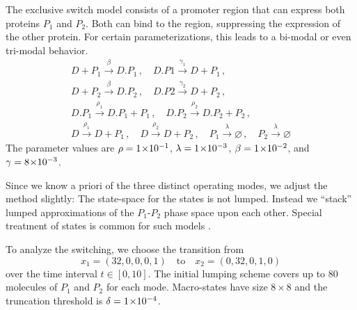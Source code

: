 \begin{model}\label{model:excl_switch_2} The exclusive switch model consists of a promoter region
that can express both proteins $P_1$ and $P_2$. Both can bind to the region, suppressing
the expression of the other protein. For certain parameterizations, this leads to a
bi-modal or even tri-modal behavior.
\begin{gather*}
	D + P_1 \xrightarrow{\beta} D.P_1\,,\quad
	D.P1 \xrightarrow{\gamma_1} D + P_1  \,,\\
	D + P_2 \xrightarrow{\beta} D.P_2 \,,\quad
	D.P2 \xrightarrow{\gamma_2} D + P_2 \,,\\
	D.P_1 \xrightarrow{\rho_1} D.P_1 + P_1\,, \quad
    D.P_2 \xrightarrow{\rho_2} D.P_2 + P_2\,,\\
	D \xrightarrow{\rho_1} D + P_1\,,\quad
	D \xrightarrow{\rho_2} D + P_2\,,  \quad
	P_1 \xrightarrow{\lambda}\varnothing  \,,\quad
    P_2\xrightarrow{\lambda} \varnothing
\end{gather*}
The parameter values are $\rho= 1\!\times\hspace{-.5ex} 10^{-1} $, $\lambda= 1\!\times\hspace{-.5ex} 10^{-3} $, $\beta= 1\!\times\hspace{-.5ex} 10^{-2} $, and $\gamma= 8\!\times\hspace{-.5ex} 10^{-3} $.
\end{model}
Since we know a priori of the three distinct operating modes, we adjust
the method slightly:
The state-space for the  states is not lumped. Instead we ``stack''
lumped approximations of the $P_1$-$P_2$ phase space upon each other. Special treatment of  states is common for such models \parencite{lapin2011shave}. 

To analyze the switching, we choose the transition from
\[
	x_{1} = (32, 0, 0, 0, 1) 
    \quad
    \text{to}
    \quad
 x_2 = (0, 32, 0, 1, 0) 
\]
over the time interval $t\in[0,10]$.
The initial lumping scheme covers up to \num{80} molecules of $P_1$ and $P_2$ for each mode.
Macro-states have size $8\times8$ and
the truncation threshold is $\delta= 1\!\times\hspace{-.5ex} 10^{-4} $.

